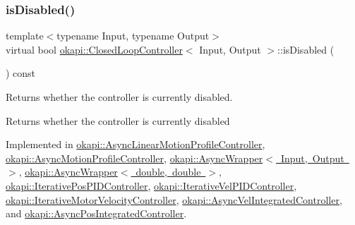 \mbox{\label{classokapi_1_1ClosedLoopController_a40bd4ec2b8c75503fbf6f494fd7cbe69}} 
\subsubsection{\texorpdfstring{isDisabled()}{isDisabled()}}
{\footnotesize\ttfamily template$<$typename Input, typename Output$>$ \\
virtual bool \mbox{\hyperlink{classokapi_1_1ClosedLoopController}{okapi\+::\+Closed\+Loop\+Controller}}$<$ Input, Output $>$\+::is\+Disabled (\begin{DoxyParamCaption}{ }\end{DoxyParamCaption}) const\hspace{0.3cm}{\ttfamily [pure virtual]}}

Returns whether the controller is currently disabled.

\begin{DoxyReturn}{Returns}
whether the controller is currently disabled 
\end{DoxyReturn}


Implemented in \mbox{\hyperlink{classokapi_1_1AsyncLinearMotionProfileController_a99ae2e378cc88745c82a08b6ddf52ee4}{okapi\+::\+Async\+Linear\+Motion\+Profile\+Controller}}, \mbox{\hyperlink{classokapi_1_1AsyncMotionProfileController_a04bc0f7be2c116163bfbef0571dec2ef}{okapi\+::\+Async\+Motion\+Profile\+Controller}}, \mbox{\hyperlink{classokapi_1_1AsyncWrapper_a83d411851373f0483b5ae392560a180a}{okapi\+::\+Async\+Wrapper$<$ Input, Output $>$}}, \mbox{\hyperlink{classokapi_1_1AsyncWrapper_a83d411851373f0483b5ae392560a180a}{okapi\+::\+Async\+Wrapper$<$ double, double $>$}}, \mbox{\hyperlink{classokapi_1_1IterativePosPIDController_a8800531c198ae47c0e7b602db2dd10d3}{okapi\+::\+Iterative\+Pos\+P\+I\+D\+Controller}}, \mbox{\hyperlink{classokapi_1_1IterativeVelPIDController_a628a5093634f85d788015c4cc1353c54}{okapi\+::\+Iterative\+Vel\+P\+I\+D\+Controller}}, \mbox{\hyperlink{classokapi_1_1IterativeMotorVelocityController_a3d0383caf0fb0b982806e224492af473}{okapi\+::\+Iterative\+Motor\+Velocity\+Controller}}, \mbox{\hyperlink{classokapi_1_1AsyncVelIntegratedController_ad4c6394b3512ae44ffa36c9e01f6321b}{okapi\+::\+Async\+Vel\+Integrated\+Controller}}, and \mbox{\hyperlink{classokapi_1_1AsyncPosIntegratedController_a8774fe656abb2cf72d046b40ba3572a9}{okapi\+::\+Async\+Pos\+Integrated\+Controller}}.

